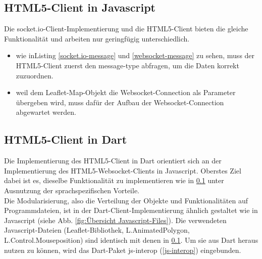 \subsection{HTML5-Client in Javascript}\label{HTML5-Client in Javascript}
Die socket.io-Client-Implementierung und die HTML5-Client bieten die gleiche Funktionalität und arbeiten nur geringfügig unterschiedlich.
 \begin{itemize}
 \item wie inListing \ref{socket.io-message} und \ref{websocket-message} zu sehen, muss der HTML5-Client zuerst den message-type abfragen, um die Daten korrekt zuzuordnen.
 \item weil dem Leaflet-Map-Objekt die Websocket-Connection als Parameter übergeben wird, muss dafür der Aufbau der Websocket-Connection abgewartet werden. 
\end{itemize}
\subsection{HTML5-Client in Dart}\label{HTML5-Client in Dart}
Die Implementierung des HTML5-Client in Dart orientiert sich an der Implementierung des HTML5-Websocket-Clients in Javascript. Oberstes Ziel dabei ist es, dieselbe Funktionalität zu implementieren wie in \ref{HTML5-Client in Javascript} unter Ausnutzung der sprachspezifischen Vorteile. \\

Die Modularisierung, also die Verteilung der Objekte und Funktionalitäten auf Programmdateien, ist in der Dart-Client-Implementierung ähnlich gestaltet wie in Javascript (siehe Abb. \ref{fig:Übersicht Javascript-Files}). Die verwendeten Javascript-Dateien (Leaflet-Bibliothek, L.AnimatedPolygon, L.Control.Mouseposition) sind identisch mit denen in \ref{HTML5-Client in Javascript}. Um sie aus Dart heraus nutzen zu können, wird das Dart-Paket js-interop (\ref{js-interop}) eingebunden.

